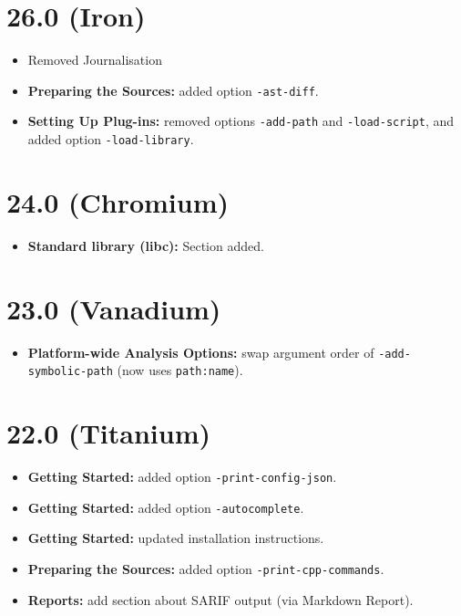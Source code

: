\section*{26.0 (Iron)}
\begin{itemize}
\item Removed Journalisation
\item \textbf{Preparing the Sources:} added option \texttt{-ast-diff}.
\item \textbf{Setting Up Plug-ins:} removed options \texttt{-add-path} and
  \texttt{-load-script}, and added option \texttt{-load-library}.
\end{itemize}

\section*{24.0 (Chromium)}
\begin{itemize}
\item \textbf{Standard library (libc):} Section added.
\end{itemize}

\section*{23.0 (Vanadium)}

\begin{itemize}
\item \textbf{Platform-wide Analysis Options:} swap argument order of
  \texttt{-add-symbolic-path} (now uses \texttt{path:name}).
\end{itemize}

\section*{22.0 (Titanium)}

\begin{itemize}
\item \textbf{Getting Started:} added option
  \texttt{-print-config-json}.
\item \textbf{Getting Started:} added option
  \texttt{-autocomplete}.
\item \textbf{Getting Started:} updated installation instructions.
\item \textbf{Preparing the Sources:} added option
  \texttt{-print-cpp-commands}.
\item \textbf{Reports:} add section about SARIF output
  (via \textsf{Markdown Report}).
\end{itemize}

